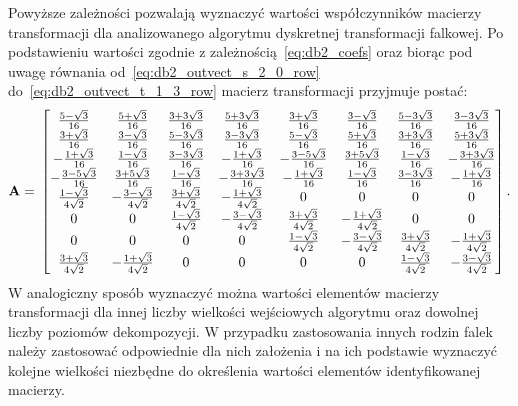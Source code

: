 Powyższe zależności pozwalają wyznaczyć wartości współczynników macierzy transformacji dla analizowanego algorytmu dyskretnej transformacji falkowej. Po podstawieniu wartości zgodnie z zależnością~\eqref{eq:db2_coefs} oraz biorąc pod uwagę równania od~\eqref{eq:db2_outvect_s_2_0_row} do~\eqref{eq:db2_outvect_t_1_3_row} macierz transformacji przyjmuje postać:
\begin{equation}
\mathbf{A} = \\
\begin{bmatrix}
\frac{5 - \sqrt{3}}{16} & \frac{5 + \sqrt{3}}{16} & \frac{3 + 3 \sqrt{3}}{16} & \frac{5 + 3 \sqrt{3}}{16} & \frac{3 + \sqrt{3}}{16} & \frac{3 - \sqrt{3}}{16} & \frac{5 - 3 \sqrt{3}}{16} & \frac{3 - 3 \sqrt{3}}{16} \\
\frac{3 + \sqrt{3}}{16} & \frac{3 - \sqrt{3}}{16} & \frac{5 - 3 \sqrt{3}}{16} & \frac{3 - 3 \sqrt{3}}{16} & \frac{5 - \sqrt{3}}{16} & \frac{5 + \sqrt{3}}{16} & \frac{3 + 3 \sqrt{3}}{16} & \frac{5 + 3 \sqrt{3}}{16} \\
- \frac{1 + \sqrt{3}}{16} & \frac{1 - \sqrt{3}}{16} & \frac{3 - 3 \sqrt{3}}{16} & - \frac{1 + \sqrt{3}}{16} & - \frac{3 - 5 \sqrt{3}}{16} & \frac{3 + 5 \sqrt{3}}{16} & \frac{1 - \sqrt{3}}{16} & - \frac{3 + 3 \sqrt{3}}{16} \\
- \frac{3 - 5 \sqrt{3}}{16} & \frac{3 + 5 \sqrt{3}}{16} & \frac{1 - \sqrt{3}}{16} & - \frac{3 + 3 \sqrt{3}}{16} & - \frac{1 + \sqrt{3}}{16} & \frac{1 - \sqrt{3}}{16} & \frac{3 - 3 \sqrt{3}}{16} & - \frac{1 + \sqrt{3}}{16} \\
\frac{1 - \sqrt{3}}{4 \sqrt{2}} & - \frac{3 - \sqrt{3}}{4 \sqrt{2}} & \frac{3 + \sqrt{3}}{4 \sqrt{2}} & - \frac{1 + \sqrt{3}}{4 \sqrt{2}} & 0 & 0 & 0 & 0 \\
0 & 0 & \frac{1 - \sqrt{3}}{4 \sqrt{2}} & - \frac{3 - \sqrt{3}}{4 \sqrt{2}} & \frac{3 + \sqrt{3}}{4 \sqrt{2}} & - \frac{1 + \sqrt{3}}{4 \sqrt{2}} & 0 & 0 \\
0 & 0 & 0 & 0 & \frac{1 - \sqrt{3}}{4 \sqrt{2}} & - \frac{3 - \sqrt{3}}{4 \sqrt{2}} & \frac{3 + \sqrt{3}}{4 \sqrt{2}} & - \frac{1 + \sqrt{3}}{4 \sqrt{2}} \\
\frac{3 + \sqrt{3}}{4 \sqrt{2}} & - \frac{1 + \sqrt{3}}{4 \sqrt{2}} & 0 & 0 & 0 & 0 & \frac{1 - \sqrt{3}}{4 \sqrt{2}} & - \frac{3 - \sqrt{3}}{4 \sqrt{2}}
\end{bmatrix}
\label{eq:db2_2_8_matrix}.
\end{equation}
W analogiczny sposób wyznaczyć można wartości elementów macierzy transformacji dla innej liczby wielkości wejściowych algorytmu oraz dowolnej liczby poziomów dekompozycji. W przypadku zastosowania innych rodzin falek należy zastosować odpowiednie dla nich założenia i na ich podstawie wyznaczyć kolejne wielkości niezbędne do określenia wartości elementów identyfikowanej macierzy.

